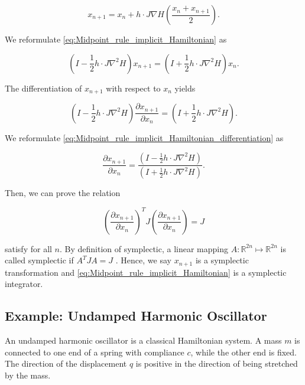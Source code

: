 \documentclass[
	parskip, 			   %
	twoside, 			   %
	DIV=14, 			   %
	BCOR=15.0mm, 		   %
	headsepline, 		   %
	open=right, 		   %
	captions=tableheading, %
	bibliography=totoc,    %
	numbers=noenddot       %
]{scrreprt}
\begin{document}
\begin{equation}
    \label{eq:Midpoint_rule_implicit_Hamiltonian}
    x_{n+1} = x_{n} + h \cdot J \nabla H \left(\frac{x_{n} + x_{n+1}}{2}\right).
\end{equation}

We reformulate \ref{eq:Midpoint_rule_implicit_Hamiltonian} as

\begin{equation}
    \left(I - \frac{1}{2} h \cdot J \nabla^2 H\right)x_{n+1} = \left(I + \frac{1}{2} h \cdot J \nabla^2 H \right)x_{n}.
\end{equation}

The differentiation of $x_{n+1}$ with respect to $x_{n}$ yields

\begin{equation}
    \label{eq:Midpoint_rule_implicit_Hamiltonian_differentiation}
    \left(I - \frac{1}{2} h \cdot J \nabla^2 H \right) \frac{\partial x_{n+1}}{\partial x_{n}} = \left(I + \frac{1}{2} h \cdot J \nabla^2 H \right).
\end{equation}

We reformulate \ref{eq:Midpoint_rule_implicit_Hamiltonian_differentiation} as

\begin{equation}
    \frac{\partial x_{n+1}}{\partial x_{n}} = \frac{\left(I - \frac{1}{2} h \cdot J \nabla^2 H \right)}{\left(I + \frac{1}{2} h \cdot J \nabla^2 H \right)} .
\end{equation}

Then, we can prove the relation

\begin{equation}
    \label{eq:Midpoint_rule_implicit_symplecticity}
    \left(\frac{\partial x_{n+1}}{\partial x_{n}}\right)^T J \left(\frac{\partial x_{n+1}}{\partial x_{n}}\right) = J
\end{equation}

satisfy for all $n$. By definition of symplectic, a linear mapping $A: \mathbb{R}^{2n} \mapsto \mathbb{R}^{2n}$ is called symplectic if $A^T J A = J$ \cite{hairer2006geometric}. Hence, we say $x_{n+1}$ is a symplectic transformation and \ref{eq:Midpoint_rule_implicit_Hamiltonian} is a symplectic integrator.


\subsection{Example: Undamped Harmonic Oscillator}
An undamped harmonic oscillator is a classical Hamiltonian system. A mass $m$ is connected to one end of a spring with compliance $c$, while the other end is fixed. The direction of the displacement $q$ is positive in the direction of being stretched by the mass.
\end{document}
